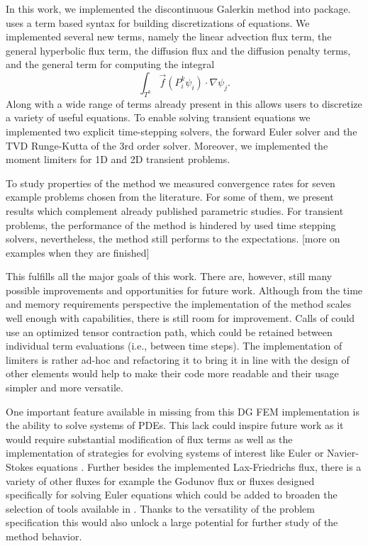 In this work, we implemented the discontinuous Galerkin method into \sfepy{}
package. \sfepy{} uses a term based syntax for building discretizations of
equations. We implemented several new terms, namely the linear advection flux
term, the general hyperbolic flux term, the diffusion flux and the diffusion
penalty terms, and the general term for computing the integral
$$
\int_{T^k} \vec{f}(P_i^k\psi_i)\cdot\nabla\psi_j.
$$
Along with a wide range of terms already present in \sfepy{} this allows users
to discretize a variety of useful equations. To enable solving transient
equations we implemented two explicit time-stepping solvers, the forward Euler
solver and the TVD Runge-Kutta of the 3rd order solver. Moreover, we
implemented the moment limiters for 1D and 2D transient problems.

To study properties of the method we measured convergence rates for seven
example problems chosen from the literature. For some of them, we present
results which complement already published parametric studies. For transient
problems, the performance of the method is hindered by used time stepping
solvers, nevertheless, the method still performs to the expectations.
[\todo more on examples when they are finished]

This fulfills all the major goals of this work. There are, however, still many
possible improvements and opportunities for future work. Although from the
time and memory requirements perspective the implementation of the method
scales well enough with \sfepy{} capabilities, there is still room for
improvement. Calls of  could use an optimized tensor
contraction path, which could be retained between individual term evaluations
(i.e., between time steps). The implementation of limiters is rather ad-hoc and
refactoring it to bring it in line with the design of other \sfepy{} elements
would help to make their code more readable and their usage simpler and more
versatile.

One important feature available in \sfepy{} missing from this DG FEM
implementation is the ability to solve systems of PDEs. This lack could inspire
future work as it would require substantial modification of flux terms as well
as the implementation of strategies for evolving systems of interest like Euler
or Navier-Stokes equations \cite{Hesthaven2008}. Further besides the
implemented Lax-Friedrichs flux, there is a variety of other fluxes for example
the Godunov flux \cite{DiPietro2012} or fluxes designed specifically for
solving Euler equations \cite[Section 3.3]{Kucera} which could be added to
broaden the selection of tools available in \sfepy{}. Thanks to the versatility
of the problem specification this would also unlock a large potential for
further study of the method behavior.